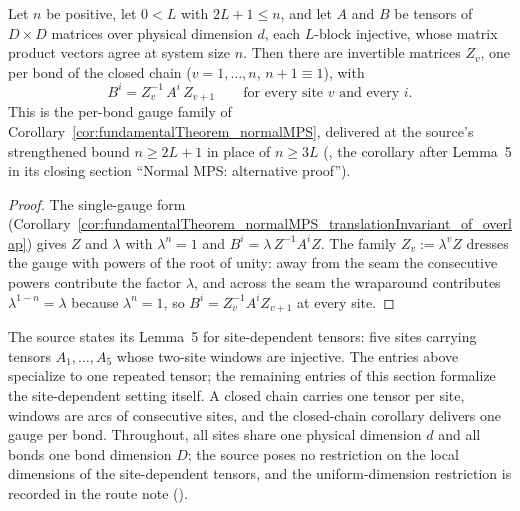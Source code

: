 \begin{corollary}%
    \label{cor:fundamentalTheorem_normalMPS_of_overlap}
    \leanok
    Let $n$ be positive, let $0 < L$ with $2L + 1 \le n$, and let $A$ and
    $B$ be tensors of $D \times D$ matrices over physical dimension $d$,
    each $L$-block injective, whose matrix product vectors agree at system
    size $n$.  Then there are invertible matrices $Z_v$, one per bond of
    the closed chain ($v = 1, \ldots, n$, $n + 1 \equiv 1$), with
    \[
        B^i = Z_v^{-1}\, A^i\, Z_{v+1}
        \qquad\text{for every site } v \text{ and every } i .
    \]
    This is the per-bond gauge family of
    Corollary~\ref{cor:fundamentalTheorem_normalMPS}, delivered at the
    source's strengthened bound $n \ge 2L + 1$ in place of $n \ge 3L$
    (\cite{Molnar2018NormalPEPS}, the corollary after Lemma~5 in its
    closing section ``Normal MPS: alternative proof'').
\end{corollary}
\begin{proof}\leanok
    The single-gauge form
    (Corollary~\ref{cor:fundamentalTheorem_normalMPS_translationInvariant_of_overlap})
    gives $Z$ and $\lambda$ with $\lambda^n = 1$ and
    $B^i = \lambda\,Z^{-1} A^i Z$.  The family $Z_v := \lambda^{v} Z$
    dresses the gauge with powers of the root of unity: away from the seam
    the consecutive powers contribute the factor $\lambda$, and across the
    seam the wraparound contributes $\lambda^{1-n} = \lambda$ because
    $\lambda^n = 1$, so $B^i = Z_v^{-1} A^i Z_{v+1}$ at every site.
\end{proof}


The source states its Lemma~5 for site-dependent tensors: five sites
carrying tensors $A_1, \ldots, A_5$ whose two-site windows are injective.
The entries above specialize to one repeated tensor; the remaining entries
of this section formalize the site-dependent setting itself.  A closed
chain carries one tensor per site, windows are arcs of consecutive sites,
and the closed-chain corollary delivers one gauge per bond.  Throughout,
all sites share one physical dimension $d$ and all bonds one bond
dimension $D$; the source poses no restriction on the local dimensions of
the site-dependent tensors, and the uniform-dimension restriction is
recorded in the route note
().

